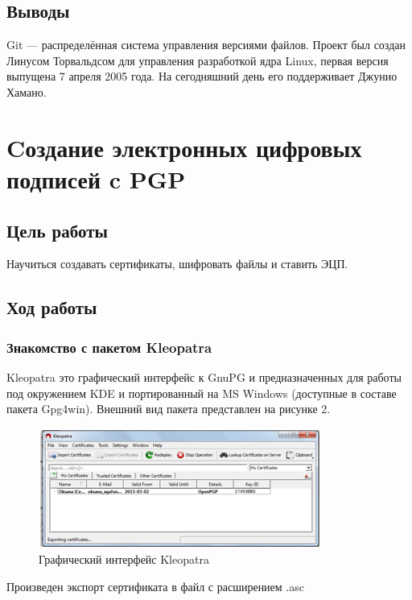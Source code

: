 \documentclass[10pt,a4paper]{article}
\begin{document}
\subsection{Выводы}

\hspace{0,6cm}Git --- распределённая система управления версиями файлов. Проект был создан Линусом Торвальдсом для управления разработкой ядра Linux, первая версия выпущена 7 апреля 2005 года. На сегодняшний день его поддерживает Джунио Хамано.

\newpage
\section{Cоздание электронных цифровых подписей c PGP}

\subsection{Цель работы}
\hspace{0,6cm}Научиться создавать сертификаты, шифровать файлы и ставить ЭЦП.

\subsection{Ход работы}

\subsubsection{Знакомство с пакетом Kleopatra}

\hspace{0,6cm}Kleopatra это графический интерфейс к GnuPG и предназначенных для работы под окружением KDE и портированный на MS Windows (доступные в составе пакета Gpg4win). Внешний вид пакета представлен на рисунке 2.

\begin{figure}[h!]
\centering
\includegraphics[scale=0.67]{res/Kleopatra}
\caption{Графический интерфейс Kleopatra}
\end{figure}

\hspace{0,6cm} Произведен экспорт сертификата в файл с расширением .asc
\end{document}

